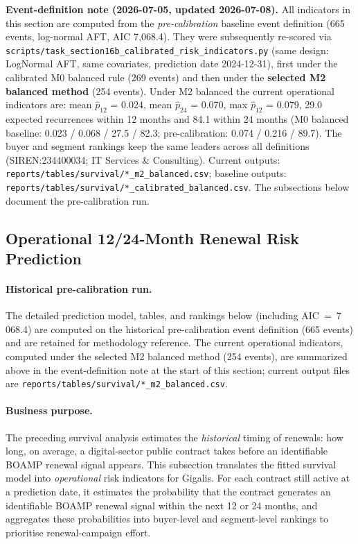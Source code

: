 \documentclass[12pt, a4paper]{article}
\begin{document}
\textbf{Event-definition note (2026-07-05, updated 2026-07-08).} All indicators
in this section are computed from the \emph{pre-calibration} baseline event
definition (665 events, log-normal AFT, AIC 7{,}068.4). They were subsequently
re-scored via
\texttt{scripts/task\_section16b\_calibrated\_risk\_indicators.py} (same
design: LogNormal AFT, same covariates, prediction date 2024-12-31), first
under the calibrated M0 balanced rule (269 events) and then under the
\textbf{selected M2 balanced method} (254 events). Under M2 balanced the
current operational indicators are: mean $\hat p_{12}$ = 0.024, mean
$\hat p_{24}$ = 0.070, max $\hat p_{12}$ = 0.079, 29.0 expected recurrences
within 12 months and 84.1 within 24 months (M0 balanced baseline: 0.023 /
0.068 / 27.5 / 82.3; pre-calibration: 0.074 / 0.216 / 89.7). The buyer and
segment rankings keep the same leaders across all definitions
(SIREN:234400034; IT Services \& Consulting). Current outputs:
\nolinkurl{reports/tables/survival/*_m2_balanced.csv}; baseline outputs:
\nolinkurl{reports/tables/survival/*_calibrated_balanced.csv}. The subsections
below document the pre-calibration run.

\subsection{Operational 12/24-Month Renewal Risk Prediction}
\label{sec:prediction}

\paragraph{Historical pre-calibration run.} The detailed prediction model,
tables, and rankings below (including AIC~=~7\,068.4) are computed on the
historical pre-calibration event definition (665 events) and are retained for
methodology reference. The current operational indicators, computed under the
selected M2 balanced method (254 events), are summarized above in the
event-definition note at the start of this section; current output files are
\nolinkurl{reports/tables/survival/*_m2_balanced.csv}.

\paragraph{Business purpose.} The preceding survival analysis estimates the
\emph{historical} timing of renewals: how long, on average, a digital-sector public
contract takes before an identifiable BOAMP renewal signal appears. This subsection
translates the fitted survival model into \emph{operational} risk indicators for Gigalis.
For each contract still active at a prediction date, it estimates the probability that the
contract generates an identifiable BOAMP renewal signal within the next 12 or 24 months, and
aggregates these probabilities into buyer-level and segment-level rankings to prioritise
renewal-campaign effort.
\end{document}

